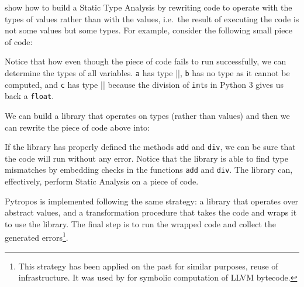 \textcite{ortin_towards_2015} show how to build a Static Type Analysis
by rewriting code to operate with the types of values rather than with
the values, i.e.~the result of executing the code is not some values but
some types. For example, consider the following small piece of code:

\begin{Shaded}
\begin{Highlighting}[]
\OperatorTok{=}  \OperatorTok{+} 
\OperatorTok{=}\OperatorTok{+}   
\OperatorTok{=}\OperatorTok{/} 
\end{Highlighting}
\end{Shaded}

Notice that how even though the piece of code fails to run successfully,
we can determine the types of all variables. \texttt{a} has type
\VERB||, \texttt{b} has no type as it cannot be
computed, and \texttt{c} has type \VERB|| because the
division of \texttt{int}s in Python 3 gives us back a \texttt{float}.

We can build a library that operates on types (rather than values) and
then we can rewrite the piece of code above into:

\begin{Shaded}
\begin{Highlighting}[]
\OperatorTok{=}\NormalTok{, }\NormalTok{)}
\OperatorTok{=}\NormalTok{)}
\OperatorTok{=}\NormalTok{)}
\end{Highlighting}
\end{Shaded}

If the library has properly defined the methods \texttt{add} and
\texttt{div}, we can be sure that the code will run without any error.
Notice that the library is able to find type mismatches by embedding
checks in the functions \texttt{add} and \texttt{div}. The library can,
effectively, perform Static Analysis on a piece of code.

Pytropos is implemented following the same strategy: a library that
operates over abstract values, and a transformation procedure that takes
the code and wraps it to use the library. The final step is to run the
wrapped code and collect the generated errors\footnote{This strategy has
  been applied on the past for similar purposes, reuse of
  infrastructure. It was used by \textcite{lauko_symbolic_2018} for
  symbolic computation of LLVM bytecode. {}}.

